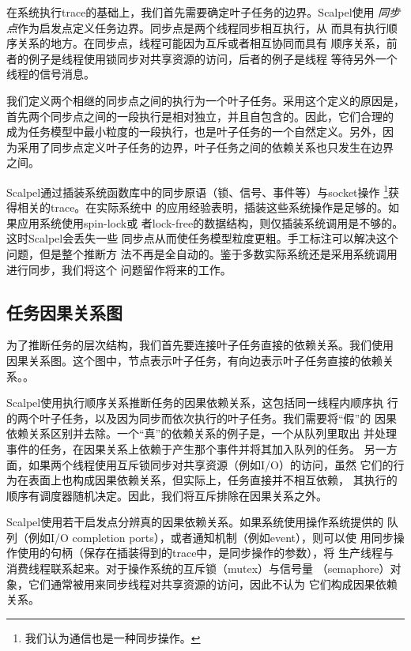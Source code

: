 在系统执行trace的基础上，我们首先需要确定叶子任务的边界。Scalpel使用
\emph{同步点}作为启发点定义任务边界。同步点是两个线程同步相互执行，从
而具有执行顺序关系的地方。在同步点，线程可能因为互斥或者相互协同而具有
顺序关系，前者的例子是线程使用锁同步对共享资源的访问，后者的例子是线程
等待另外一个线程的信号消息。

我们定义两个相继的同步点之间的执行为一个叶子任务。采用这个定义的原因是，
首先两个同步点之间的一段执行是相对独立，并且自包含的。因此，它们合理的
成为任务模型中最小粒度的一段执行，也是叶子任务的一个自然定义。另外，因
为采用了同步点定义叶子任务的边界，叶子任务之间的依赖关系也只发生在边界
之间。

Scalpel通过插装系统函数库中的同步原语（锁、信号、事件等）与socket操作
\footnote{我们认为通信也是一种同步操作。}获得相关的trace。在实际系统中
的应用经验表明，插装这些系统操作是足够的。如果应用系统使用spin-lock或
者lock-free的数据结构，则仅插装系统调用是不够的。这时Scalpel会丢失一些
同步点从而使任务模型粒度更粗。手工标注可以解决这个问题，但是整个推断方
法不再是全自动的。鉴于多数实际系统还是采用系统调用进行同步，我们将这个
问题留作将来的工作。

\subsection{任务因果关系图}

为了推断任务的层次结构，我们首先要连接叶子任务直接的依赖关系。我们使用
因果关系图。这个图中，节点表示叶子任务，有向边表示叶子任务直接的依赖关
系。。

Scalpel使用执行顺序关系推断任务的因果依赖关系，这包括同一线程内顺序执
行的两个叶子任务，以及因为同步而依次执行的叶子任务。我们需要将“假”的
因果依赖关系区别并去除。一个“真”的依赖关系的例子是，一个从队列里取出
并处理事件的任务，在因果关系上依赖于产生那个事件并将其加入队列的任务。
另一方面，如果两个线程使用互斥锁同步对共享资源（例如I/O）的访问，虽然
它们的行为在表面上也构成因果依赖关系，但实际上，任务直接并不相互依赖，
其执行的顺序有调度器随机决定。因此，我们将互斥排除在因果关系之外。

Scalpel使用若干启发点分辨真的因果依赖关系。如果系统使用操作系统提供的
队列（例如I/O completion ports），或者通知机制（例如event），则可以使
用同步操作使用的句柄（保存在插装得到的trace中，是同步操作的参数），将
生产线程与消费线程联系起来。对于操作系统的互斥锁（mutex）与信号量
（semaphore）对象，它们通常被用来同步线程对共享资源的访问，因此不认为
它们构成因果依赖关系。



